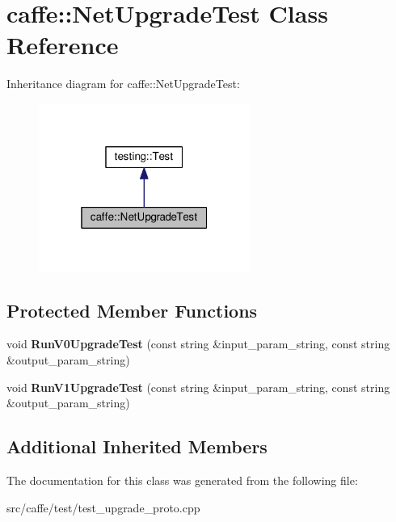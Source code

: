\hypertarget{classcaffe_1_1_net_upgrade_test}{}\section{caffe\+:\+:Net\+Upgrade\+Test Class Reference}
\label{classcaffe_1_1_net_upgrade_test}


Inheritance diagram for caffe\+:\+:Net\+Upgrade\+Test\+:
\nopagebreak
\begin{figure}[H]
\begin{center}
\leavevmode
\includegraphics[width=196pt]{classcaffe_1_1_net_upgrade_test__inherit__graph}
\end{center}
\end{figure}
\subsection*{Protected Member Functions}
\begin{DoxyCompactItemize}
\item 
\mbox{\label{classcaffe_1_1_net_upgrade_test_accdec2623c7be3e728e30c77dbb6bc7b}} 
void {\bfseries Run\+V0\+Upgrade\+Test} (const string \&input\+\_\+param\+\_\+string, const string \&output\+\_\+param\+\_\+string)
\item 
\mbox{\label{classcaffe_1_1_net_upgrade_test_a01bd4df461e6b032d66a287c31282934}} 
void {\bfseries Run\+V1\+Upgrade\+Test} (const string \&input\+\_\+param\+\_\+string, const string \&output\+\_\+param\+\_\+string)
\end{DoxyCompactItemize}
\subsection*{Additional Inherited Members}


The documentation for this class was generated from the following file\+:\begin{DoxyCompactItemize}
\item 
src/caffe/test/test\+\_\+upgrade\+\_\+proto.\+cpp\end{DoxyCompactItemize}
